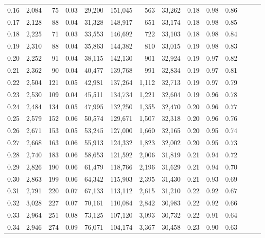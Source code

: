 \begin{tabular}{rrrrrrrrrrrrrr}
0.16 &  2,084 &     75 &  0.03 &   29,200 &  151,045 &     563 &  33,262 &  0.18 &  0.98 &      0.86 \\
0.17 &  2,128 &     88 &  0.04 &   31,328 &  148,917 &     651 &  33,174 &  0.18 &  0.98 &      0.85 \\
0.18 &  2,225 &     71 &  0.03 &   33,553 &  146,692 &     722 &  33,103 &  0.18 &  0.98 &      0.84 \\
0.19 &  2,310 &     88 &  0.04 &   35,863 &  144,382 &     810 &  33,015 &  0.19 &  0.98 &      0.83 \\
0.20 &  2,252 &     91 &  0.04 &   38,115 &  142,130 &     901 &  32,924 &  0.19 &  0.97 &      0.82 \\
0.21 &  2,362 &     90 &  0.04 &   40,477 &  139,768 &     991 &  32,834 &  0.19 &  0.97 &      0.81 \\
0.22 &  2,504 &    121 &  0.05 &   42,981 &  137,264 &   1,112 &  32,713 &  0.19 &  0.97 &      0.79 \\
0.23 &  2,530 &    109 &  0.04 &   45,511 &  134,734 &   1,221 &  32,604 &  0.19 &  0.96 &      0.78 \\
0.24 &  2,484 &    134 &  0.05 &   47,995 &  132,250 &   1,355 &  32,470 &  0.20 &  0.96 &      0.77 \\
0.25 &  2,579 &    152 &  0.06 &   50,574 &  129,671 &   1,507 &  32,318 &  0.20 &  0.96 &      0.76 \\
0.26 &  2,671 &    153 &  0.05 &   53,245 &  127,000 &   1,660 &  32,165 &  0.20 &  0.95 &      0.74 \\
0.27 &  2,668 &    163 &  0.06 &   55,913 &  124,332 &   1,823 &  32,002 &  0.20 &  0.95 &      0.73 \\
0.28 &  2,740 &    183 &  0.06 &   58,653 &  121,592 &   2,006 &  31,819 &  0.21 &  0.94 &      0.72 \\
0.29 &  2,826 &    190 &  0.06 &   61,479 &  118,766 &   2,196 &  31,629 &  0.21 &  0.94 &      0.70 \\
0.30 &  2,863 &    199 &  0.06 &   64,342 &  115,903 &   2,395 &  31,430 &  0.21 &  0.93 &      0.69 \\
0.31 &  2,791 &    220 &  0.07 &   67,133 &  113,112 &   2,615 &  31,210 &  0.22 &  0.92 &      0.67 \\
0.32 &  3,028 &    227 &  0.07 &   70,161 &  110,084 &   2,842 &  30,983 &  0.22 &  0.92 &      0.66 \\
0.33 &  2,964 &    251 &  0.08 &   73,125 &  107,120 &   3,093 &  30,732 &  0.22 &  0.91 &      0.64 \\
0.34 &  2,946 &    274 &  0.09 &   76,071 &  104,174 &   3,367 &  30,458 &  0.23 &  0.90 &      0.63 \\

\end{tabular}
